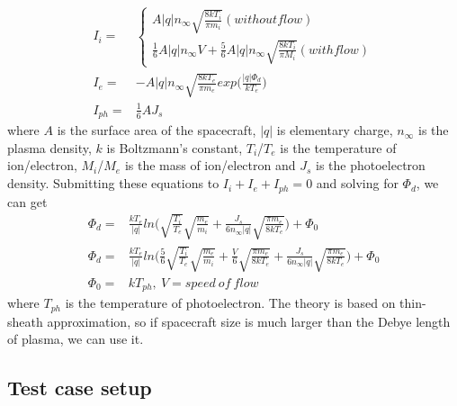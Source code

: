 \begin{equation}
\begin{split}
 I_i = &
    \left\{\begin{array}{ccc}
       A|q|n_\infty\sqrt{\frac{8 k T_i}{\pi m_i}} (without flow)\\
       \frac{1}{6}A |q|n_\infty V + \frac{5}{6} A |q| n_\infty \sqrt{\frac{8 k T_i}{\pi M_i}}(with flow)
      \end{array}\right. \\
  I_e = & -A|q|n_\infty \sqrt{\frac{8 k T_e}{\pi m_e}}exp\Big(\frac{|q|\Phi_d}{k T_e}\Big)\\
  I_{ph} = & \frac{1}{6} AJ_s
\end{split}
\label{thin sheet potential}
\end{equation}
where \(A\) is the surface area of the spacecraft, \(|q|\) is elementary charge, \(n_\infty\) is the plasma density, \(k\) is Boltzmann's constant, \(T_i\)/\(T_e\) is the temperature of ion/electron, \(M_i\)/\(M_e\) is the mass of ion/electron and \(J_s\) is the photoelectron density.
Submitting these equations to \(I_i+I_e+I_{ph}=0\) and solving for $\Phi_d$, we can get
\begin{equation}
\begin{split}
 \Phi_d = & \frac{k T_e}{|q|}ln\Big(\sqrt{\frac{T_i}{T_e}}\sqrt{\frac{m_e}{m_i}}+\frac{J_s}{6 n_\infty |q|}\sqrt{\frac{\pi m_e}{8 k T_e}}\Big) + \Phi_0 \\
 \Phi_d = & \frac{k T_e}{|q|}ln\Big(\frac{5}{6}\sqrt{\frac{T_i}{T_e}}\sqrt{\frac{m_e}{m_i}}+\frac{V}{6}\sqrt{\frac{\pi m_e}{8 k T_e}} + \frac{J_s}{6 n_\infty |q|}\sqrt{\frac{\pi m_e}{8 k T_e}} \Big)+\Phi_0 \\
 \Phi_0 = & k T_{ph}, \ V = speed\ of\ flow
\end{split}
\label{thin sheet potential 2}
\end{equation}
where \(T_{ph}\) is the temperature of photoelectron.
The theory is based on thin-sheath approximation, so if spacecraft size is much larger than the Debye length of plasma, we can use it.\\

\subsection{Test case setup}

